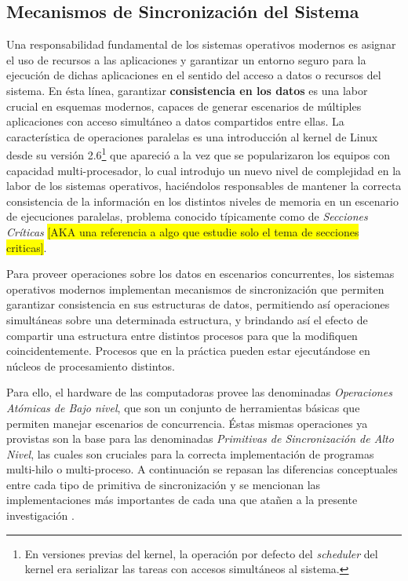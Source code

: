 \subsection{Mecanismos de Sincronización del Sistema}
Una responsabilidad fundamental de los sistemas operativos modernos es asignar el uso de recursos a las aplicaciones y garantizar un entorno seguro para la ejecución de dichas aplicaciones en el sentido del acceso a datos o recursos del sistema. En ésta línea, garantizar \textbf{consistencia en los datos} es una labor crucial en esquemas modernos, capaces de generar escenarios de múltiples aplicaciones con acceso simultáneo a datos compartidos entre ellas. La característica de operaciones paralelas es una introducción al kernel de Linux desde su versión 2.6\footnote{En versiones previas del kernel, la operación por defecto del \emph{scheduler} del kernel era serializar las tareas con accesos simultáneos al sistema.} que apareció a la vez que se popularizaron los equipos con capacidad multi-procesador, lo cual introdujo un nuevo nivel de complejidad en la labor de los sistemas operativos, haciéndolos responsables de mantener la correcta consistencia de la información en los distintos niveles de memoria en un escenario de ejecuciones paralelas, problema conocido típicamente como de \emph{Secciones Críticas} \colorbox{yellow}{[AKA una referencia a algo que estudie solo el tema de secciones criticas]}.

Para proveer operaciones sobre los datos en escenarios concurrentes, los sistemas operativos modernos implementan mecanismos de sincronización que permiten garantizar consistencia en sus estructuras de datos, permitiendo así operaciones simultáneas sobre una determinada estructura, y brindando así el efecto de compartir una estructura entre distintos procesos para que la modifiquen coincidentemente. Procesos que en la práctica pueden estar ejecutándose en núcleos de procesamiento distintos.

Para ello, el hardware de las computadoras provee las denominadas \emph{Operaciones Atómicas de Bajo nivel}, que son un conjunto de herramientas básicas que permiten manejar escenarios de concurrencia. Éstas mismas operaciones ya provistas son la base para las denominadas \emph{Primitivas de Sincronización de Alto Nivel}, las cuales son cruciales para la correcta implementación de programas multi-hilo o multi-proceso. A continuación se repasan las diferencias conceptuales entre cada tipo de primitiva de sincronización y se mencionan las implementaciones más importantes de cada una que atañen a la presente investigación \cite{book:SOConcepts}.


